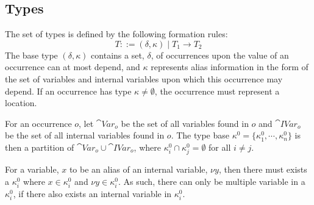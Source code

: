 \documentclass{llncs}
\begin{document}


\subsection{Types}\label{sec:types}

The set of types  is defined by the following formation rules:
%
\[ T ::=(\delta,\kappa)\mid T_1 \rightarrow T_2 \]
%
The base type $(\delta,\kappa)$ contains a set, $\delta$, of occurrences upon the value of an occurrence can at most depend,
and $\kappa$ represents alias information in the form of the set of variables and internal variables upon which this occurrence may depend.
If an occurrence has type $\kappa \neq \emptyset$,
the occurrence must represent a location.

\begin{definition}
	For an occurrence $o$, let $\cat{Var}_o$ be the set of all
        variables found in $o$ and $\cat{IVar}_o$ be the set of all
        internal variables found in $o$.
	The type base $\kappa^0=\{\kappa^0_1,\cdots,\kappa^0_n\}$ is
        then a partition of $\cat{Var}_o \cup \cat{IVar}_o$, where
        $\kappa_i^0\cap\kappa_j^0=\emptyset$ for all $i\neq j$. 
\end{definition}
For a variable, $x$ to be an alias of an internal variable, $\nu y$, then there must exists a $\kappa^0_i$ where $x \in \kappa^0_i$ and $\nu y \in \kappa^0_i$.
As such, there can only be multiple variable in a $\kappa^0_i$, if there also exists an internal variable in $\kappa^0_i$.

\end{document}
